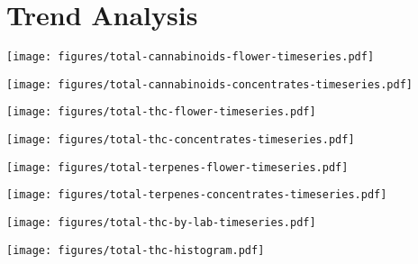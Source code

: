 \documentclass[../article.tex, 12pt]{subfiles}
\begin{document}
\newpage
\section*{Trend Analysis}
\label{sec:Trend Analysis}

\vspace{2\baselineskip}

\texttt{[image: figures/total-cannabinoids-flower-timeseries.pdf]}

\vspace{2\baselineskip}

\texttt{[image: figures/total-cannabinoids-concentrates-timeseries.pdf]}

\texttt{[image: figures/total-thc-flower-timeseries.pdf]}

\vspace{2\baselineskip}

\texttt{[image: figures/total-thc-concentrates-timeseries.pdf]}

\vspace{2\baselineskip}

\texttt{[image: figures/total-terpenes-flower-timeseries.pdf]}

\vspace{2\baselineskip}

\texttt{[image: figures/total-terpenes-concentrates-timeseries.pdf]}

\vspace{2\baselineskip}

\texttt{[image: figures/total-thc-by-lab-timeseries.pdf]}

\vspace{2\baselineskip}

\begin{center}
\texttt{[image: figures/total-thc-histogram.pdf]}
\end{center}


\end{document}
